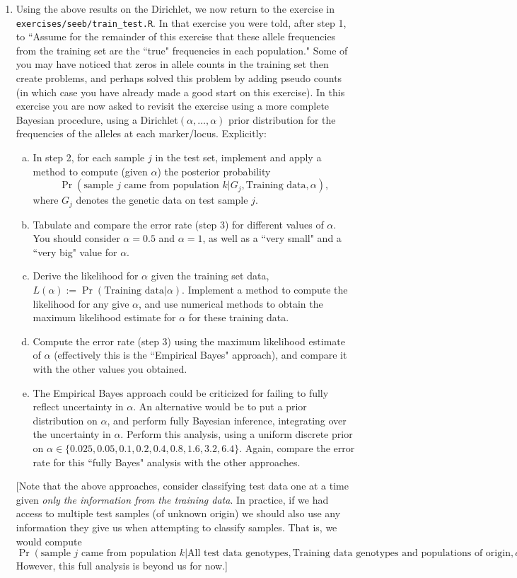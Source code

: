 \documentclass[12pt]{article}
\def\train{\text{Training data}}
\begin{document}
\begin{enumerate}
\item Using the above results on the Dirichlet, we now return to the exercise in \verb|exercises/seeb/train_test.R|. In that exercise you were told, after step 1, to ``Assume for the remainder of this exercise that these allele frequencies from the training set are the ``true" frequencies in each population." Some of you may have noticed that zeros in allele
counts in the training set then create problems, and perhaps solved this problem by adding pseudo counts (in which case you have already
made a good start on this exercise). In this exercise you are now asked to revisit the exercise using a more complete Bayesian procedure, 
using a Dirichlet$(\alpha,\dots,\alpha)$ prior distribution for the frequencies of the alleles at each marker/locus. Explicitly:
\begin{enumerate}[a)]
\item In step 2, for each sample $j$ in the test set, implement and apply a method to compute (given $\alpha$) the posterior probability 
$$\Pr(\text{sample $j$ came from population $k$} | G_j, \text{Training data}, \alpha),$$ 
where $G_j$ denotes the genetic data on test sample $j$. 
\item  Tabulate and compare the error rate (step 3) for different values of $\alpha$. 
You should consider $\alpha=0.5$ and $\alpha=1$, as well as a ``very small" and a ``very big" value for $\alpha$.
\item Derive the likelihood for $\alpha$ given the training set data, $L(\alpha) :=\Pr(\train | \alpha)$. Implement a method to compute
the likelihood for any give $\alpha$, and use numerical methods to obtain the maximum likelihood estimate for $\alpha$
for these training data.
\item Compute the error rate (step 3) using the maximum likelihood estimate of $\alpha$ (effectively this is the ``Empirical Bayes" approach), and compare it with the other values you obtained.
\item The Empirical Bayes approach could be criticized for failing to fully reflect uncertainty in $\alpha$. An alternative would be to put a prior distribution on $\alpha$, and perform 
fully Bayesian inference, integrating over the uncertainty in $\alpha$. Perform this analysis, using a uniform discrete prior on $\alpha \in \{0.025,0.05,0.1,0.2,0.4,0.8,1.6,3.2,6.4\}$. Again, compare the error rate for this ``fully Bayes" analysis with the other approaches. 
\end{enumerate}
 [Note that the above approaches, consider classifying test data one at a time given {\it only the information from the training data}.
 In practice, if we had access to multiple test samples (of unknown origin) we should also use any information they
 give us when attempting to classify samples. That is, we would
compute 
$$\Pr(\text{sample $j$ came from population $k$} | \text{All test data genotypes}, \text{Training data genotypes and populations of origin},\alpha).$$ However, this full analysis is beyond us for now.]



\end{enumerate}
\end{document}

